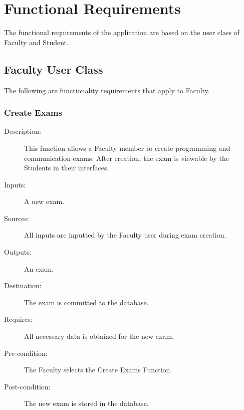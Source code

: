 %
%



\section{Functional Requirements}
The functional requirements of the application are based on the user class of
Faculty and Student.
\subsection{Faculty User Class}
The following are functionality requirements that apply to Faculty.
\subsubsection{\large Create Exams} 
\begin{boxed} %
\begin{description}
\item[Description:]
   This function allows a Faculty member to create programming and communication
   exams. After creation, the exam is viewable by the Students in their
   interfaces.
\item[Inputs:]
   A new exam.
\item[Sources:]
   All inputs are inputted by the Faculty user during exam creation.
\item[Outputs:]
   An exam.
\item[Destination:]
   The exam is committed to the database.
\item[Requires:]
   All necessary data is obtained for the new exam.
\item[Pre-condition:]
   The Faculty selects the Create Exams Function.
\item[Post-condition:]
   The new exam is stored in the database.
\end{description}
\end{boxed} %

